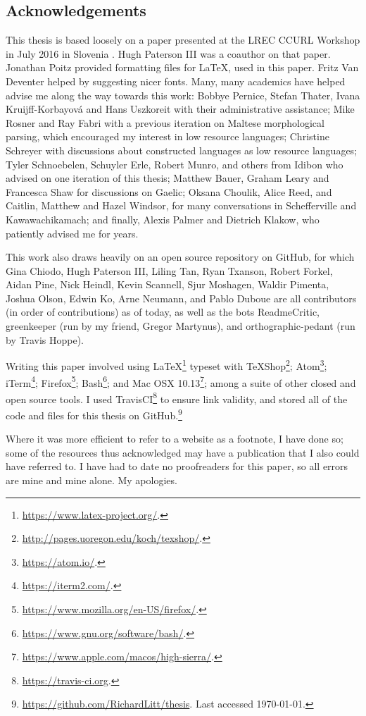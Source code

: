 \thispagestyle{empty}
\noindent\subsection*{Acknowledgements}

This thesis is based loosely on a paper presented at the LREC CCURL Workshop in July 2016 in Slovenia \citep{CCURL}. Hugh Paterson III was a coauthor on that paper. Jonathan Poitz provided formatting files for \LaTeX, used in this paper. Fritz Van Deventer helped by suggesting nicer fonts. Many, many academics have helped advise me along the way towards this work: Bobbye Pernice, Stefan Thater, Ivana Kruijff-Korbayov\'a and Hans Uszkoreit with their administrative assistance; Mike Rosner and Ray Fabri with a previous iteration on Maltese morphological parsing, which encouraged my interest in low resource languages; Christine Schreyer with discussions about constructed languages as low resource languages; Tyler Schnoebelen, Schuyler Erle, Robert Munro, and others from Idibon who advised on one iteration of this thesis; Matthew Bauer, Graham Leary and Francesca Shaw for discussions on Gaelic; Oksana Choulik, Alice Reed, and Caitlin, Matthew and Hazel Windsor, for many conversations in Schefferville and Kawawachikamach; and finally, Alexis Palmer and Dietrich Klakow, who patiently advised me for years.

This work also draws heavily on an open source repository on GitHub, for which Gina Chiodo, Hugh Paterson III, Liling Tan, Ryan Txanson, Robert Forkel, Aidan Pine, Nick Heindl, Kevin Scannell, Sjur Moshagen, Waldir Pimenta, Joshua Olson, Edwin Ko, Arne Neumann, and Pablo Duboue are all contributors (in order of contributions) as of today, as well as the bots ReadmeCritic, greenkeeper (run by my friend, Gregor Martynus), and orthographic-pedant (run by Travis Hoppe).

Writing this paper involved using LaTeX\footnote{\href{https://www.latex-project.org/}{https://www.latex-project.org/}. } typeset with TeXShop\footnote{\href{http://pages.uoregon.edu/koch/texshop/}{http://pages.uoregon.edu/koch/texshop/}. }; Atom\footnote{\href{https://atom.io/}{https://atom.io/}. }; iTerm\footnote{\href{https://iterm2.com/}{https://iterm2.com/}. }; Firefox\footnote{\href{https://www.mozilla.org/en-US/firefox/}{https://www.mozilla.org/en-US/firefox/}. }; Bash\footnote{\href{https://www.gnu.org/software/bash/}{https://www.gnu.org/software/bash/}. }; and Mac OSX 10.13\footnote{\href{https://www.apple.com/macos/high-sierra/}{https://www.apple.com/macos/high-sierra/}. }; among a suite of other closed and open source tools. I used TravisCI\footnote{\href{https://travis-ci.org}{https://travis-ci.org}. } to ensure link validity, and stored all of the code and files for this thesis on GitHub.\footnote{\href{https://github.com/RichardLitt/thesis}{https://github.com/RichardLitt/thesis}. Last accessed \today.}

Where it was more efficient to refer to a website as a footnote, I have done so; some of the resources thus acknowledged may have a publication that I also could have referred to. I have had to date no proofreaders for this paper, so all errors are mine and mine alone. My apologies.